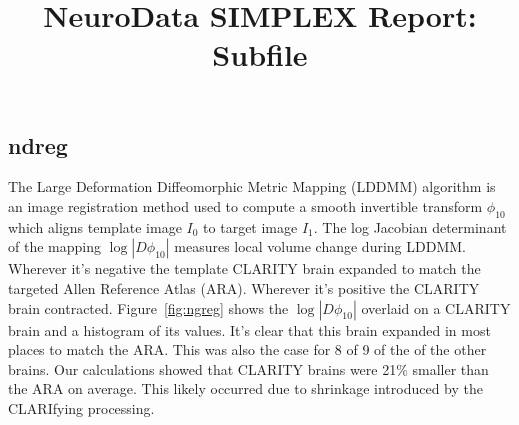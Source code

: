 \documentclass[simplex.tex]{subfiles}
\title{NeuroData SIMPLEX Report: Subfile}
\begin{document}


\subsection{ndreg}

The Large Deformation Diffeomorphic Metric Mapping (LDDMM) algorithm is
an image registration method used to compute a smooth invertible
transform $\phi_{10}$ which aligns template image $I_0$ to target
image $I_1$. The log Jacobian determinant of the mapping $\log
|D\phi_{10}|$ measures local volume change during LDDMM.  Wherever it’s
negative the template CLARITY brain expanded to match the targeted Allen
Reference Atlas (ARA).  Wherever it’s positive the CLARITY brain
contracted.  Figure~\ref{fig:ngreg} shows the $\log |D\phi_{10}|$ overlaid
on a CLARITY brain and a histogram of its values.  It’s clear that this
brain expanded in most places to match the ARA.  This was also the case
for 8 of 9 of the of the other brains.  Our calculations showed that
CLARITY brains were 21\% smaller than the ARA on average.  This likely
occurred due to shrinkage introduced by the CLARIfying processing.
\end{document}
